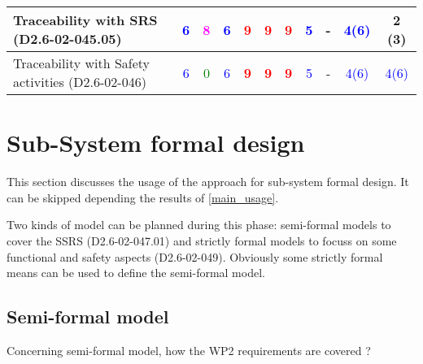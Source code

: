\begin{tabular}{|l | c | c | c | c | c | c | c | c | c | c |}
\hline
Traceability with SRS (D2.6-02-045.05) & \textcolor{blue}{6} & \textcolor{magenta}{8} & \textcolor{blue}{6} & \textcolor{red}{\textbf{9}} & \textcolor{red}{\textbf{9}} & \textcolor{red}{\textbf{9}} & \textcolor{blue}{5} & - & \textcolor{blue}{4(6)}  & 2 (3) \\
\hline
Traceability with Safety activities (D2.6-02-046) & \textcolor{blue}{6} & \textcolor{green}{0} & \textcolor{blue}{6} & \textcolor{red}{\textbf{9}} & \textcolor{red}{\textbf{9}} & \textcolor{red}{\textbf{9}} & \textcolor{blue}{5} & - & \textcolor{blue}{4(6)}  & \textcolor{blue}{4(6)}  \\
\hline
\end{tabular}



\section{Sub-System formal design}
This section discusses the usage of the approach for sub-system formal design.
It can be skipped depending the results of \ref{main_usage}.

Two kinds of model can be planned during this phase: semi-formal models to  cover the SSRS (D2.6-02-047.01) and strictly formal  models to  focuss on some functional and safety aspects (D2.6-02-049).  Obviously some strictly  formal means can be used to define the semi-formal  model.

\subsection{Semi-formal model}

Concerning semi-formal model, how the WP2 requirements are covered ?

